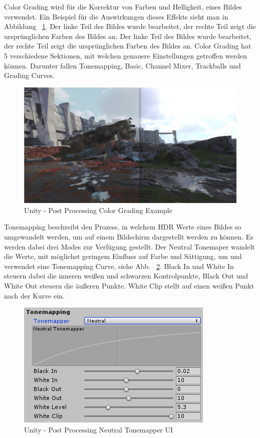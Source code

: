 Color Grading wird für die Korrektur von Farben und Helligkeit, eines Bildes verwendet.
Ein Beispiel für die Auswirkungen dieses Effekts sieht man in Abbildung ~\ref{fig:unity-post-processing-color-grading-example}.
Der linke Teil des Bildes wurde bearbeitet, der rechte Teil zeigt die ursprünglichen Farben des Bildes an.
Der linke Teil des Bildes wurde bearbeitet, der rechte Teil zeigt die ursprünglichen Farben des Bildes an.
Color Grading hat 5 verschiedene Sektionen, mit welchen genauere Einstellungen getroffen werden können.
Darunter fallen Tonemapping, Basic, Channel Mixer, Trackballs und Grading Curves.
~\cite{Unity_Post_Processing_ColorGrading_2022}
\begin {figure}
    \centering
    \includegraphics[scale=0.4]{pics/unity-post-processing-color-grading-before-after}
    \caption{Unity - Post Processing Color Grading Example}
    \label{fig:unity-post-processing-color-grading-example}
\end {figure}

Tonemapping beschreibt den Prozess, in welchem HDR Werte eines Bildes so umgewandelt werden, um auf einem Bildschirm dargestellt werden zu können.
Es werden dabei drei Modes zur Verfügung gestellt.
Der Neutral Tonemaper wandelt die Werte, mit möglichst geringem Einfluss auf Farbe und Sättigung, um und verwendet eine Tonemapping Curve, siehe Abb. ~\ref{fig:unity-post-processing-neutral-tonemapper-ui}.
Black In und White In steuern dabei die inneren weißen und schwarzen Kontrolpunkte, Black Out und White Out steuern die äußeren Punkte.
White Clip stellt auf einen weißen Punkt nach der Kurve ein.
\begin {figure}
    \centering
    \includegraphics[scale=0.9]{pics/unity-post-processing-color-grading-neutralTonemapper}
    \caption{Unity - Post Processing Neutral Tonemapper UI}
    \label{fig:unity-post-processing-neutral-tonemapper-ui}
\end {figure}

